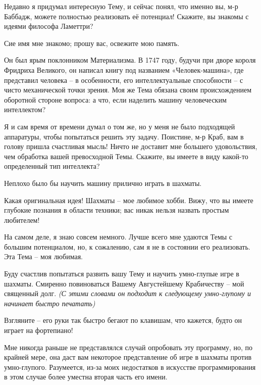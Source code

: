 \documentclass[../main.tex]{subfiles}
\begin{document}
\begin{dialogue}
 Недавно я придумал интересную Тему, и сейчас понял, что именно вы, м-р Баббадж, можете полностью реализовать её потенциал! Скажите, вы знакомы с идеями философа Ламеттри?

 Сие имя мне знакомо; прошу вас, освежите мою память.

 Он был ярым поклонником Материализма. В 1747 году, будучи при дворе короля Фридриха Великого, он написал книгу под названием «Человек-машина», где представил человека \--- в особенности, его интеллектуальные способности \--- с чисто механической точки зрения. Моя же Тема обязана своим происхождением оборотной стороне вопроса: а что, если наделить машину человеческим интеллектом?

 Я и сам время от времени думал о том же, но у меня не было подходящей аппаратуры, чтобы попытаться решить эту задачу. Поистине, м-р Краб, вам в голову пришла счастливая мысль! Ничто не доставит мне большего удовольствия, чем обработка вашей превосходной Темы. Скажите, вы имеете в виду какой-то определенный тип интеллекта?

 Неплохо было бы научить машину прилично играть в шахматы.

 Какая оригинальная идея! Шахматы \--- мое любимое хобби. Вижу, что вы имеете глубокие познания в области техники; вас никак нельзя назвать простым любителем!

 На самом деле, я знаю совсем немного. Лучше всего мне удаются Темы с большим потенциалом, но, к сожалению, сам я не в состоянии его реализовать. Эта Тема \--- моя любимая.

 Буду счастлив попытаться развить вашу Тему и научить умно-глупые игре в шахматы. Смиренно повиноваться Вашему Августейшему Крабичеству \--- мой священный долг. \emph{(С этими словами он подходит к следующему умно-глупому и начинает быстро печатать)}

 Взгляните \--- его руки так быстро бегают по клавишам, что кажется, будто он играет на фортепиано!

 Мне никогда раньше не представлялся случай опробовать эту программу, но, по крайней мере, она даст вам некоторое представление об игре в шахматы против умно-глупого. Разумеется, из-за моих недостатков в искусстве программирования в этом случае более уместна вторая часть его имени.



\end{dialogue}
\end{document}

